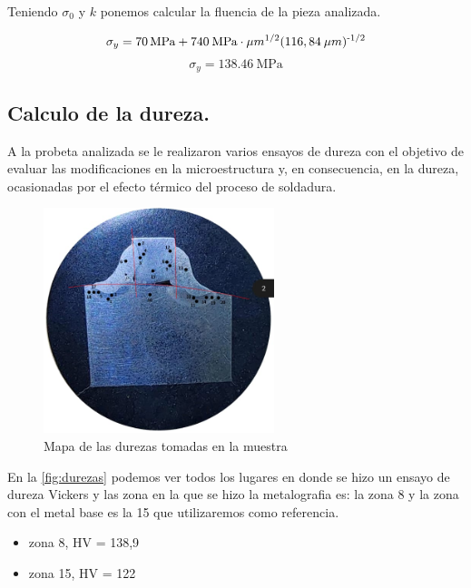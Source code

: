 \documentclass[12pt,a4paper]{article}
\begin{document}
Teniendo $\sigma_0$ y $k$ ponemos calcular la fluencia de la pieza analizada.

\begin{equation}
    \sigma_y = \SI{70}{\mega\pascal} + 740\: \text{MPa}\cdot \mu m\textsuperscript{1/2} (116,84\: \mu m)\textsuperscript{-1/2}
\end{equation}
\begin{equation}
    \sigma_y = \SI{138,46}{\mega\pascal} 
\end{equation}

\subsection{Calculo de la dureza.}

A la probeta analizada se le realizaron varios ensayos de dureza con el objetivo de evaluar las modificaciones en la microestructura y, en consecuencia, en la dureza, ocasionadas por el efecto térmico del proceso de soldadura.

\begin{figure}[h] 
    \centering
    \includegraphics[width=0.6\textwidth]{Figuras/mapa_de_durezas.png} 
    \caption{Mapa de las durezas tomadas en la muestra}
    \label{fig:durezas}
\end{figure}

En la \autoref{fig:durezas} podemos ver todos los lugares en donde se hizo un ensayo de dureza Vickers y las zona en la que se hizo la metalografia es: la zona 8 y la zona con el metal base es la 15 que utilizaremos como referencia.

\begin{itemize}
    \item zona 8, HV = 138,9
    \item zona 15, HV = 122
\end{itemize}
\end{document}
